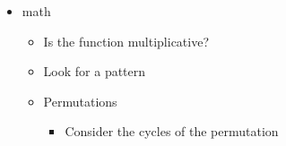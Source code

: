 \documentclass[8pt,a4paper,landscape,oneside]{amsart}
\newenvironment{myitemize}
{ \begin{itemize}[leftmargin=.5cm]
    \setlength{\itemsep}{0pt}
    \setlength{\parskip}{0pt}
    \setlength{\parsep}{0pt}     }
{ \end{itemize}                  }
\begin{document}
\begin{multicols*}{3}
\begin{myitemize}
\begin{itemize}
\begin{itemize}
                                \item Centers of the tree
                            \end{itemize}
                        \item Eulerian path/circuit
                        \item Chinese postman problem
                        \item Topological sort
                        \item (Min-Cost) Max Flow
                        \item Min Cut
                            \begin{itemize}
                                \item Maximum Density Subgraph
                            \end{itemize}
                        \item Huffman Coding
                        \item Min-Cost Arborescence
                        \item Steiner Tree
                        \item Kirchoff's matrix tree theorem
                        \item Pr\"ufer sequences
                        \item Lov\'asz Toggle
                        \item Look at the DFS tree (which has no cross-edges)
                        \item Is the graph a DFA or NFA?
                            \begin{itemize}
                                \item Is it the Synchronizing word problem?
                            \end{itemize}
                    \end{itemize}
                \item math
                    \begin{itemize}
                        \item Is the function multiplicative?
                        \item Look for a pattern
                        \item Permutations
                            \begin{itemize}
                                \item Consider the cycles of the permutation

\end{itemize}
\end{itemize}
\end{myitemize}
\end{multicols*}
\end{document}
